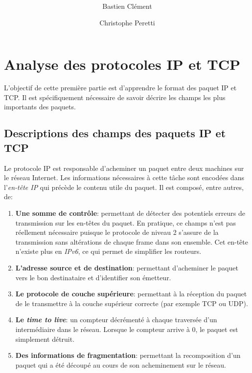 \documentclass[11pt,a4paper]{article}
\author{Bastien Clément \and Christophe Peretti}
\title{{\normalsize \doccourse} \\ \doctitle }
\begin{document}
\maketitle
\vspace{1em}

\section{Analyse des protocoles IP et TCP}

L'objectif de cette première partie est d'apprendre le format des paquet IP et TCP. Il est spécifiquement nécessaire de savoir décrire les champs les plus importants des paquets.

\subsection{Descriptions des champs des paquets IP et TCP}

Le protocole IP est responsable d'acheminer un paquet entre deux machines sur le réseau Internet. Les informations nécessaires à cette tâche sont encodées dans l'\textit{en-tête IP} qui précède le contenu utile du paquet. Il est composé, entre autres, de:

\begin{enumerate}
	\item \textbf{Une somme de contrôle}: permettant de détecter des potentiels erreurs de transmission sur les en-têtes du paquet. En pratique, ce champs n'est pas réellement nécessaire puisque le protocole de niveau 2 s'assure de la transmission sans altérations de chaque frame dans son ensemble. Cet en-tête n'existe plus en \textit{IPv6}, ce qui permet de simplifier les routeurs.
	\item \textbf{L'adresse source et de destination}: permettant d'acheminer le paquet vers le bon destinataire et d'identifier son émetteur.
	\item \textbf{Le protocole de couche supérieure}: permettant à la réception du paquet de le transmettre à la couche supérieur correcte (par exemple TCP ou UDP).
	\item \textbf{Le \textit{time to live}}: un compteur décrémenté à chaque traversée d'un intermédiaire dans le réseau. Lorsque le compteur arrive à 0, le paquet est simplement détruit.
	\item \textbf{Des informations de fragmentation}: permettant la recomposition d'un paquet qui a été découpé au cours de son acheminement sur le réseau.
\end{enumerate}
\end{document}
